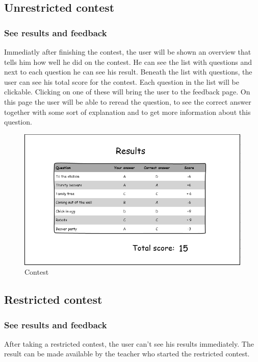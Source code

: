 \subsection*{Unrestricted contest}

\subsubsection*{See results and feedback}
Immediatly after finishing the contest, the user will be shown an overview that tells him how well he did on the contest. He can see the list with questions and next to each question he can see his result. Beneath the list with questions, the user can see his total score for the contest. Each question in the list will be clickable. Clicking on one of these will bring the user to the feedback page. On this page the user will be able to reread the question, to see the correct answer together with some sort of explanation and to get more information about this question.  

		\begin{figure}[h]
		  \centering
			\includegraphics[width=1\textwidth]{formal/img/results.png}
		  \caption{Contest}
		  \label{Contest}
		\end{figure}

\subsection*{Restricted contest}

\subsubsection*{See results and feedback}
After taking a restricted contest, the user can't see his results immediately. The result can be made available by the teacher who started the restricted contest. 

